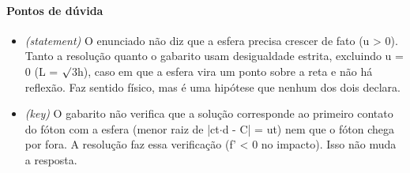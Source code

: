 \documentclass{article}%
\begin{document}
\paragraph{Pontos de dúvida}%
\begin{itemize}%
\item%
\textit{(statement)} O enunciado não diz que a esfera precisa crescer de fato (u > 0). Tanto a resolução quanto o gabarito usam desigualdade estrita, excluindo u = 0 (L = $\surd$3h), caso em que a esfera vira um ponto sobre a reta e não há reflexão. Faz sentido físico, mas é uma hipótese que nenhum dos dois declara.%
\item%
\textit{(key)} O gabarito não verifica que a solução corresponde ao primeiro contato do fóton com a esfera (menor raiz de |ct$\cdot$d - C| = ut) nem que o fóton chega por fora. A resolução faz essa verificação (f' < 0 no impacto). Isso não muda a resposta.%
\end{itemize}%
\end{document}
